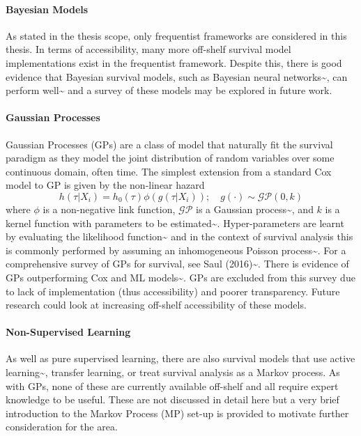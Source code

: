 \documentclass[
  letterpaper,
]{scrbook}
\let\oldparagraph\paragraph
\renewcommand{\paragraph}[1]{\oldparagraph{#1}\mbox{}}
\theoremstyle{plain}
\theoremstyle{definition}
\theoremstyle{remark}
\begin{document}
\paragraph{Bayesian Models}

As stated in the thesis scope, only frequentist frameworks are
considered in this thesis. In terms of accessibility, many more
off-shelf survival model implementations exist in the frequentist
framework. Despite this, there is good evidence that Bayesian survival
models, such as Bayesian neural
networks\textasciitilde{}\cite{Bakker2004, Faraggi1997}, can perform
well\textasciitilde{}\cite{Bishop2006} and a survey of these models may
be explored in future work.

\paragraph{Gaussian Processes}

Gaussian Processes (GPs) are a class of model that naturally fit the
survival paradigm as they model the joint distribution of random
variables over some continuous domain, often time. The simplest
extension from a standard Cox model to GP is given by the non-linear
hazard \[
h(\tau|X_i) = h_0(\tau)\phi(g(\tau|X_i)); \quad g(\cdot) \sim \mathcal{G}\mathcal{P}(0, k)
\] where \(\phi\) is a non-negative link function,
\(\mathcal{G}\mathcal{P}\) is a Gaussian
process\textasciitilde{}\cite{Rasmussen2004}, and \(k\) is a kernel
function with parameters to be estimated\textasciitilde{}\cite{Kim2018}.
Hyper-parameters are learnt by evaluating the likelihood
function\textasciitilde{}\cite{Bishop2006} and in the context of
survival analysis this is commonly performed by assuming an
inhomogeneous Poisson
process\textasciitilde{}\cite{Fernandez2016a, Saul2016, Vehtari2013}.
For a comprehensive survey of GPs for survival, see Saul
(2016)\textasciitilde{}\cite{Saul2016}. There is evidence of GPs
outperforming Cox and ML models\textasciitilde{}\cite{Fernandez2016a}.
GPs are excluded from this survey due to lack of implementation (thus
accessibility) and poorer transparency. Future research could look at
increasing off-shelf accessibility of these models.

\paragraph{Non-Supervised Learning}

As well as pure supervised learning, there are also survival models that
use active learning\textasciitilde{}\cite{Nezhad2019}, transfer
learning, or treat survival analysis as a Markov process. As with GPs,
none of these are currently available off-shelf and all require expert
knowledge to be useful. These are not discussed in detail here but a
very brief introduction to the Markov Process (MP) set-up is provided to
motivate further consideration for the area.
\end{document}
